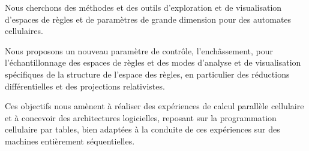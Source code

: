 \documentclass[a4paper,12pt]{article}
\begin{document}
\pagestyle{empty}

Nous cherchons des m\'ethodes et des outils d'exploration et de
visualisation d'espaces de r\`egles et de param\`etres de grande dimension
pour des automates cellulaires. %

Nous proposons un nouveau param\`etre de contr\^ole, l'ench\^assement, pour
l'\'echantillonnage des espaces de r\`egles et des modes d'analyse et de
visualisation sp\'ecifiques de la structure de l'espace des r\`egles, en
particulier des r\'eductions diff\'erentielles et des projections
relativistes. %

Ces objectifs nous am\`enent \`a r\'ealiser des exp\'eriences de calcul
parall\`ele cellulaire et \`a concevoir des architectures logicielles,
reposant sur la programmation cellulaire par tables, bien adapt\'ees \`a la
conduite de ces exp\'eriences sur des machines enti\`erement
s\'equentielles. %
\end{document}
